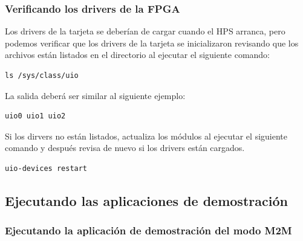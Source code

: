 \subsubsection{Verificando los drivers de la FPGA}

    Los drivers de la tarjeta se deber\'ian de cargar cuando el HPS arranca, pero podemos verificar que los drivers de la tarjeta se inicializaron revisando que los archivos  est\'an listados en el directorio  al ejecutar el siguiente comando:
    \begin{lstlisting}
ls /sys/class/uio    \end{lstlisting}

    La salida deber\'a ser similar al siguiente ejemplo:
    \begin{lstlisting}
uio0 uio1 uio2    \end{lstlisting}

    Si los dirvers no est\'an listados, actualiza los m\'odulos al ejecutar el siguiente comando y despu\'es revisa de nuevo si los drivers est\'an cargados.
    \begin{lstlisting}
uio-devices restart    \end{lstlisting}

    \subsection{Ejecutando las aplicaciones de demostraci\'on}

\subsubsection{Ejecutando la aplicaci\'on de demostraci\'on del modo M2M}

